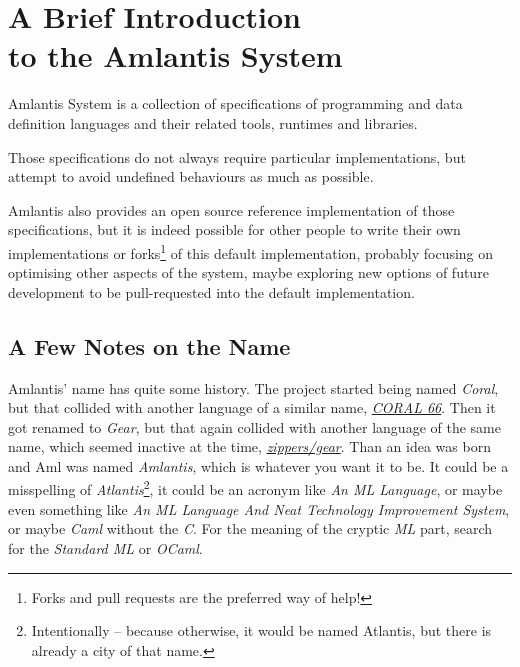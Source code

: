 
\chapter[A Brief Introduction to the Amlantis System]{A Brief Introduction \\ to the Amlantis System}
\label{sec:brief-intro}

Amlantis System is a collection of specifications of programming and data definition languages and their related tools, runtimes and libraries. 

Those specifications do not always require particular implementations, but attempt to avoid undefined behaviours as much as possible. 

Amlantis also provides an open source reference implementation of those specifications, but it is indeed possible for other people to write their own implementations or forks\footnote{Forks and pull requests are the preferred way of help!} of this default implementation, probably focusing on optimising other aspects of the system, maybe exploring new options of future development to be pull-requested into the default implementation. 





\section*{A Few Notes on the Name}

Amlantis' name has quite some history. The project started being named {\em Coral}, but that collided with another language of a similar name, \href{https://en.wikipedia.org/wiki/Coral_66}{{\em CORAL 66}}. Then it got renamed to {\em Gear}, but that again collided with another language of the same name, which seemed inactive at the time, \href{https://github.com/zippers/gear}{{\em zippers/gear}}. Than an idea was born and Aml was named {\em Amlantis}, which is whatever you want it to be. It could be a misspelling of {\em Atlantis}\footnote{Intentionally -- because otherwise, it would be named Atlantis, but there is already a city of that name.}, it could be an acronym like {\em An ML Language}, or maybe even something like {\em An ML Language And Neat Technology Improvement System}, or maybe {\em Caml} without the {\em C}. For the meaning of the cryptic {\em ML} part, search for the {\em Standard ML} or {\em OCaml}. 





